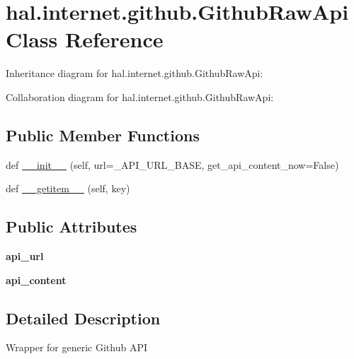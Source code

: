 \hypertarget{classhal_1_1internet_1_1github_1_1_github_raw_api}{}\section{hal.\+internet.\+github.\+Github\+Raw\+Api Class Reference}
\label{classhal_1_1internet_1_1github_1_1_github_raw_api}


Inheritance diagram for hal.\+internet.\+github.\+Github\+Raw\+Api\+:


Collaboration diagram for hal.\+internet.\+github.\+Github\+Raw\+Api\+:
\subsection*{Public Member Functions}
\begin{DoxyCompactItemize}
\item 
def \hyperlink{classhal_1_1internet_1_1github_1_1_github_raw_api_a583c2294eecab1cd68fb6b444a9798da}{\+\_\+\+\_\+init\+\_\+\+\_\+} (self, url=\+\_\+\+A\+P\+I\+\_\+\+U\+R\+L\+\_\+\+B\+A\+SE, get\+\_\+api\+\_\+content\+\_\+now=False)
\item 
def \hyperlink{classhal_1_1internet_1_1github_1_1_github_raw_api_ac4c10384fde8fae436937051cc590a7b}{\+\_\+\+\_\+getitem\+\_\+\+\_\+} (self, key)
\end{DoxyCompactItemize}
\subsection*{Public Attributes}
\begin{DoxyCompactItemize}
\item 
{\bfseries api\+\_\+url}\hypertarget{classhal_1_1internet_1_1github_1_1_github_raw_api_a33c22b5ac6f3420256d79920cfb75e03}{}\label{classhal_1_1internet_1_1github_1_1_github_raw_api_a33c22b5ac6f3420256d79920cfb75e03}

\item 
{\bfseries api\+\_\+content}\hypertarget{classhal_1_1internet_1_1github_1_1_github_raw_api_a43184819407483d8db495437ca4f2f77}{}\label{classhal_1_1internet_1_1github_1_1_github_raw_api_a43184819407483d8db495437ca4f2f77}

\end{DoxyCompactItemize}


\subsection{Detailed Description}
\begin{DoxyVerb}Wrapper for generic Github API \end{DoxyVerb}
 

